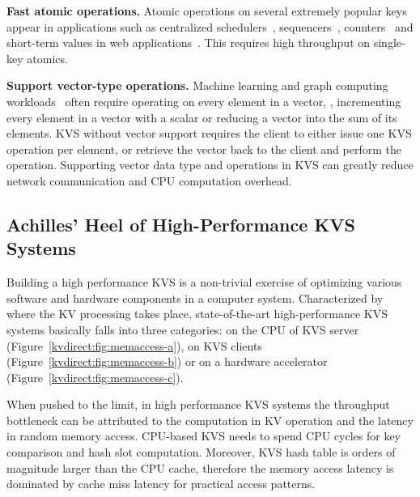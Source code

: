 \textbf{Fast atomic operations.}
Atomic operations on several extremely popular keys appear in applications such as centralized schedulers~\cite{perry2014fastpass}, sequencers~\cite{kalia2016design,eris}, counters~\cite{zhu2015packet} and short-term values in web applications~\cite{atikoglu2012workload}.
This requires high throughput on single-key atomics.

\textbf{Support vector-type operations.}
Machine learning and graph computing workloads~\cite{li2014scaling,shao2013trinity,xiao17tux2} often require operating on every element in a vector,
\eg, incrementing every element in a vector with a scalar or reducing a vector into the sum of its elements.
KVS without vector support requires the client to either issue one KVS operation per element, or retrieve the vector back to the client and perform the operation.
Supporting vector data type and operations in KVS can greatly reduce network communication and CPU computation overhead.


\subsection{Achilles' Heel of High-Performance KVS Systems}
\label{kvdirect:sec:state-of-the-art-kvs}

Building a high performance KVS is a non-trivial exercise of optimizing various software and hardware components in a computer system.
Characterized by where the KV processing takes place, state-of-the-art high-performance KVS systems basically falls into three categories:
on the CPU of KVS server
(Figure~\ref{kvdirect:fig:memaccess-a}),
on KVS clients
(Figure~\ref{kvdirect:fig:memaccess-b})
or on a hardware accelerator
(Figure~\ref{kvdirect:fig:memaccess-c}).

When pushed to the limit, in high performance KVS systems the throughput bottleneck can be attributed to the computation in KV operation and the latency in random memory access.
CPU-based KVS needs to spend CPU cycles for key comparison and hash slot computation.
Moreover, KVS hash table is orders of magnitude larger than the CPU cache, therefore the memory access latency is dominated by cache miss latency for practical access patterns.

